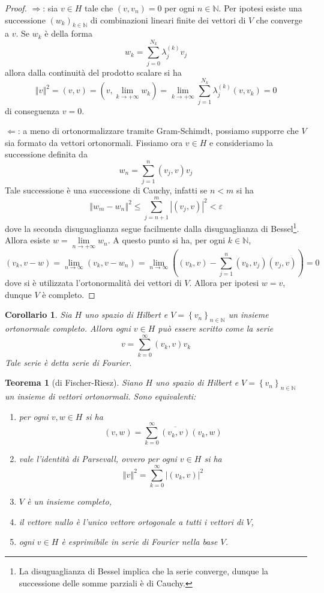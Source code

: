 \documentclass[a4paper,11pt]{book}
\newcommand{\norm}[1]{\left\Vert#1\right\Vert}
\theoremstyle{theorem}
\newtheorem{teorema}{Teorema}[section]
\newtheorem{corollario}{Corollario}[section]
\theoremstyle{definition}
\begin{document}
\begin{proof}
	$\Rightarrow$: sia $v\in H$ tale che $(v,v_n)=0$ per ogni $n\in \mathbb{N}$. Per ipotesi esiste una successione $(w_k)_{k\in\mathbb{N}}$ di combinazioni lineari finite dei vettori di $V$ che converge a $v$. Se $w_k$ è della forma
	\[w_k=\sum_{j=0}^{N_k}\lambda_j^{(k)}v_j\]
	allora dalla continuità del prodotto scalare si ha
	\[\norm{v}^2=(v,v)=(v,\lim\limits_{k\to+\infty}w_k)=\lim\limits_{k\to+\infty}\sum_{j=1}^{N_k}\lambda_j^{(k)}(v,v_k)=0\]
	di conseguenza $v=0$.
	
	\noindent $\Leftarrow$: a meno di ortonormalizzare tramite Gram-Schimdt, possiamo supporre che $V$ sia formato da vettori ortonormali. Fissiamo ora $v\in H$ e consideriamo la successione definita da
	\[w_n=\sum_{j=1}^{n}(v_j,v)v_j\]
	Tale successione è una successione di Cauchy, infatti se $n< m$ si ha
	\[\norm{w_m-w_n}^2\leq\sum_{j=n+1}^{m}|(v_j,v)|^2<\varepsilon\]
	dove la seconda disuguaglianza segue facilmente dalla disuguaglianza di Bessel\footnote{La disuguaglianza di Bessel implica che la serie converge, dunque la successione delle somme parziali è di Cauchy.}. Allora esiste $w=\lim\limits_{n\to+\infty}w_n$. A questo punto si ha, per ogni $k\in\mathbb{N}$,
	\[(v_k,v-w)=\lim\limits_{n\to\infty}(v_k,v-w_n)=\lim\limits_{n\to\infty}\left((v_k,v)-\sum_{j=1}^{n}(v_k,v_j)(v_j,v)\right)=0\]
	dove si è utilizzata l'ortonormalità dei vettori di $V$. Allora per ipotesi $w=v$, dunque $V$ è completo.	
\end{proof}
\begin{corollario}
	Sia $H$ uno spazio di Hilbert e $V=\left\{v_n\right\}_{n\in\mathbb{N}}$ un insieme ortonormale completo. Allora ogni $v\in H$ può essere scritto come la serie
	\[v=\sum_{k=0}^{\infty}(v_k,v)v_k\]
	Tale serie è detta serie di Fourier.
	\label{corollario}
\end{corollario}
\begin{teorema}[di Fischer-Riesz]
	Siano $H$ uno spazio di Hilbert e $V=\left\{v_n\right\}_{n\in\mathbb{N}}$ un insieme di vettori ortonormali. Sono equivalenti:
	\begin{enumerate}
		\item per ogni $v,w\in H$ si ha
		\[(v,w)=\sum_{k=0}^{\infty}\overline{(v_k,v)}(v_k,w)\]
		\item vale l'identità di Parsevall, ovvero per ogni $v\in H$ si ha
		\[\norm{v}^2=\sum_{k=0}^{\infty}|(v_k,v)|^2\]
		\item $V$ è un insieme completo,
		\item il vettore nullo è l'unico vettore ortogonale a tutti i vettori di $V$,
		\item ogni $v\in H$ è esprimibile in serie di Fourier nella base $V$.
	\end{enumerate}
\end{teorema}
\end{document}
